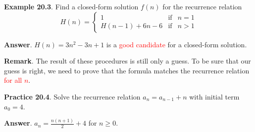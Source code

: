 \documentclass[aspectratio=169]{beamer}
\providecommand{\Red}[1]{\textcolor{red}{#1}}
\begin{document}
\begin{frame}[plain]{}

{\bf Example 20.3}. Find a closed-form solution $f(n)$ for the recurrence relation 
    \[ H(n) = \left\{ \begin{array}{ccc}
                       1 &\mbox{if}& n = 1\\
                       H(n-1)+6n-6 &\mbox{if}& n>1
                      \end{array} \right. 
    \]
  \medskip
  
  \pause
  
  {\bf Answer}. $H(n) = 3n^2-3n+1$ is a \Red{good candidate}
   for a closed-form solution.
   
   \medskip
   
  {\bf Remark}. The result of these procedures is still only a guess.
   To be sure that our guess is right, we need to prove that the formula 
   matches the recurrence relation \Red{for all $n$}. \pause
\medskip

{\bf Practice 20.4}. Solve the recurrence relation $a_n = a_{n-1}+n$
  with initial term $a_0=4$. \pause
  
  \medskip
  
  {\bf Answer}. $a_n = \frac{n(n+1)}{2}+4$ for $n\geq 0$.
  
 \vspace{1in}

\end{frame}
\end{document}
